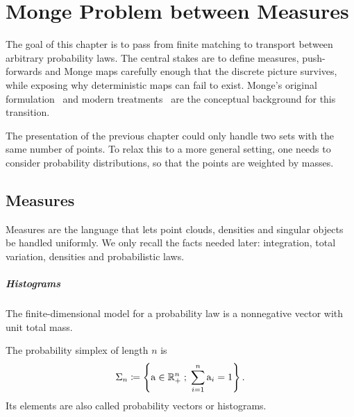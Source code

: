 
\chapter{Monge Problem between Measures}
\label{sec-monge}

The goal of this chapter is to pass from finite matching to transport between arbitrary probability laws. The central stakes are to define measures, push-forwards and Monge maps carefully enough that the discrete picture survives, while exposing why deterministic maps can fail to exist. Monge's original formulation~\cite{Monge1781} and modern treatments~\cite{Villani03,Villani09,SantambrogioBook,rachev1998mass} are the conceptual background for this transition.

The presentation of the previous chapter could only handle two sets with the same number of points. To relax this to a more general setting, one needs to consider probability distributions, so that the points are weighted by masses.

\section{Measures}
\label{sec-measures}

Measures are the language that lets point clouds, densities and singular objects be handled uniformly. We only recall the facts needed later: integration, total variation, densities and probabilistic laws.

\paragraph{Histograms}

The finite-dimensional model for a probability law is a nonnegative vector with unit total mass.

\begin{defn}\label{def-probability-simplex}
	The probability simplex of length $n$ is
	\[
		\Sigma_n \coloneqq \left\{ \mathrm{a} \in \mathbb{R}_+^n \;;\;  \sum_{i=1}^n \mathrm{a}_i = 1  \right\}.
	\]
	Its elements are also called probability vectors or histograms.
\end{defn}


